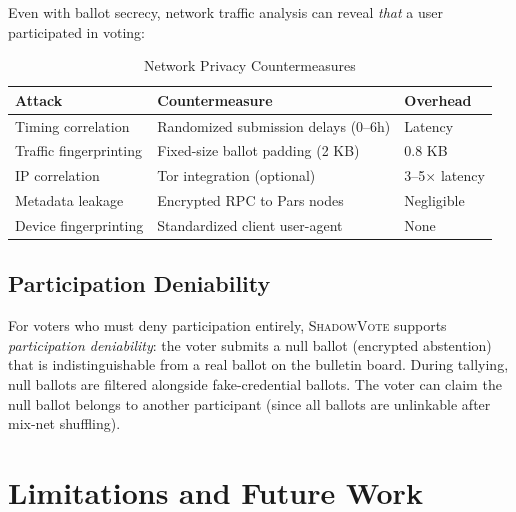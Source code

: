 \documentclass[11pt,a4paper]{article}
\newcommand{\shadow}{\textsc{ShadowVote}\xspace}
\begin{document}
Even with ballot secrecy, network traffic analysis can reveal \emph{that} a user participated in voting:

\begin{table}[H]
\centering
\caption{Network Privacy Countermeasures}
\label{tab:network}
\begin{tabular}{lll}
\toprule
\textbf{Attack} & \textbf{Countermeasure} & \textbf{Overhead} \\
\midrule
Timing correlation & Randomized submission delays (0--6h) & Latency \\
Traffic fingerprinting & Fixed-size ballot padding (2 KB) & 0.8 KB \\
IP correlation & Tor integration (optional) & 3--5$\times$ latency \\
Metadata leakage & Encrypted RPC to Pars nodes & Negligible \\
Device fingerprinting & Standardized client user-agent & None \\
\bottomrule
\end{tabular}
\end{table}

\subsection{Participation Deniability}

For voters who must deny participation entirely, \shadow supports \emph{participation deniability}: the voter submits a null ballot (encrypted abstention) that is indistinguishable from a real ballot on the bulletin board. During tallying, null ballots are filtered alongside fake-credential ballots. The voter can claim the null ballot belongs to another participant (since all ballots are unlinkable after mix-net shuffling).

\section{Limitations and Future Work}
\end{document}
